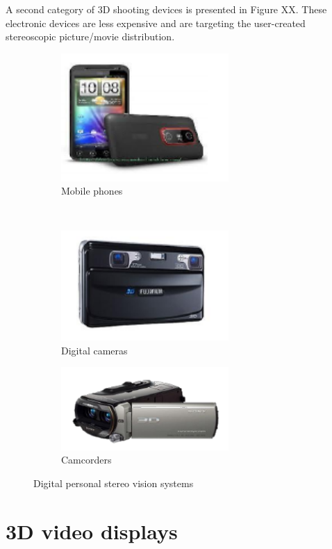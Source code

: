 A second category of 3D shooting devices is presented in Figure XX. These electronic devices are less expensive and are targeting the user-created stereoscopic picture/movie distribution.
\begin{figure}[h!]
\centering
\begin{subfigure}[]{0.4\textwidth}
\centering
\includegraphics[width=0.7\textwidth]{./img/devices1.png}
\caption{\scriptsize{Mobile phones}}
\end{subfigure}%
~ %
\begin{subfigure}[]{0.25\textwidth}
\centering
\includegraphics[width=0.7\textwidth]{./img/devices2.png}
\caption{\scriptsize{Digital cameras}}
\end{subfigure} 
\begin{subfigure}[]{0.4\textwidth}
\centering
\includegraphics[width=0.7\textwidth]{./img/devices3.png}
\caption{\scriptsize{Camcorders}}
\label{disparity}
\end{subfigure}%
\caption{\small{ Digital personal stereo vision systems}}
\end{figure}


\newpage
\section{3D video displays}




